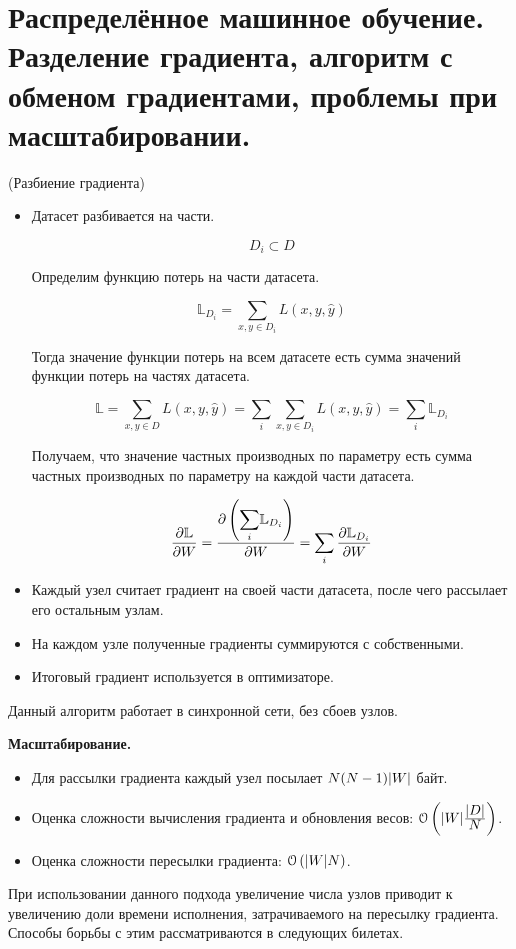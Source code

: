 \section{Распределённое машинное обучение. Разделение градиента, алгоритм с
  обменом градиентами, проблемы при масштабировании.}

\begin{algorithm}(Разбиение градиента)
  \begin{itemize}
    \item Датасет разбивается на части.

      $$D_i \subset D$$

      Определим функцию потерь на части датасета.

      $$\mathbb{L}_{D_i} = \sum_{x, y \in D_i} L(x, y, \hat{y})$$

      Тогда значение функции потерь на всем датасете есть сумма значений
      функции потерь на частях датасета.

      $$\mathbb{L} = \sum_{x, y \in D} L(x, y, \hat{y})
        = \sum_i \sum_{x, y \in D_i} L(x, y, \hat{y})
        = \sum_i \mathbb{L}_{D_i}$$

      Получаем, что значение частных производных по параметру есть сумма
      частных производных по параметру на каждой части датасета.

      $$\frac{\partial \mathbb{L}}{\partial W}
        = \frac{\partial \left( \mathlarger{\sum_i} \mathbb{L}_{D_i} \right)}
               {\partial W}
        = \sum_i \frac{\partial \mathbb{L}_{D_i}}{\partial W}$$
    \item Каждый узел считает градиент на своей части датасета, после чего
      рассылает его остальным узлам.
    \item На каждом узле полученные градиенты суммируются с собственными.
    \item Итоговый градиент используется в оптимизаторе.
  \end{itemize}
\end{algorithm}

\begin{remark} Данный алгоритм работает в синхронной сети, без сбоев узлов.
\end{remark}

\textbf{Масштабирование.}
\begin{itemize}
  \item Для рассылки градиента каждый узел посылает $N (N - 1) \lvert W\rvert$ байт.
  \item Оценка сложности вычисления градиента и обновления весов: $\mathcal{O}
    \left( \abs{W} \frac{\mathlarger{|D|}}{\mathlarger{N}} \right)$.
  \item Оценка сложности пересылки градиента: $\mathcal{O} \left( \lvert W\rvert N
    \right)$.
\end{itemize}

\begin{remark} При использовании данного подхода увеличение числа узлов приводит
  к увеличению доли времени исполнения, затрачиваемого на пересылку градиента.
  Способы борьбы с этим рассматриваются в следующих билетах.
\end{remark}
